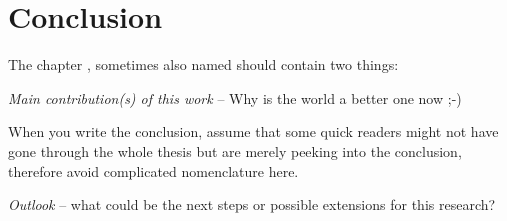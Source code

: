 
\chapter{Conclusion} \label{chapter:conclusion}

The chapter , sometimes also named 
should contain two things:

\emph{Main contribution(s) of this work} -- Why is the world a
better one now ;-)

When you write the conclusion, assume that some quick readers might
not have gone through the whole thesis but are merely peeking into
the conclusion, therefore avoid complicated nomenclature here.

\emph{Outlook} -- what could be the next steps or possible
extensions for this research?


